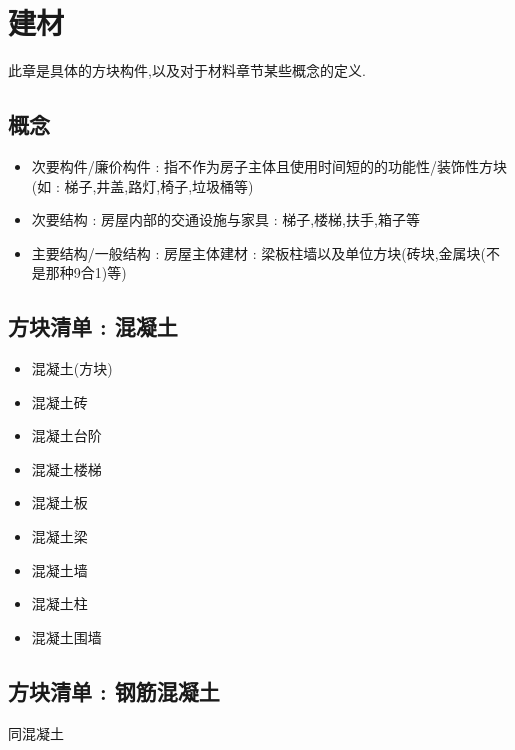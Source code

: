 \section{建材}{
  此章是具体的方块构件,以及对于材料章节某些概念的定义.

  \subsection{概念}{
      \begin{itemize}
          \item 次要构件/廉价构件 : 指不作为房子主体且使用时间短的的功能性/装饰性方块(如 : 梯子,井盖,路灯,椅子,垃圾桶等)
          \item 次要结构 : 房屋内部的交通设施与家具 : 梯子,楼梯,扶手,箱子等
          \item 主要结构/一般结构 : 房屋主体建材 : 梁板柱墙以及单位方块(砖块,金属块(不是那种9合1)等)
      \end{itemize}
  }

  \subsection{方块清单 : 混凝土}{
      \begin{itemize}
          \item 混凝土(方块)
          \item 混凝土砖
          \item 混凝土台阶
          \item 混凝土楼梯
          \item 混凝土板
          \item 混凝土梁
          \item 混凝土墙
          \item 混凝土柱
          \item 混凝土围墙
      \end{itemize}
  }

  \subsection{方块清单 : 钢筋混凝土}{
      同混凝土
  }

}
